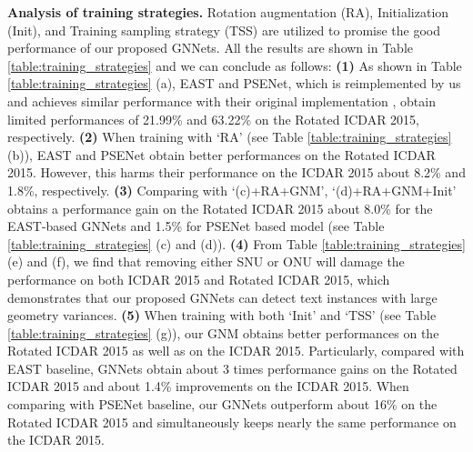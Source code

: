 \documentclass[10pt,twocolumn,letterpaper]{article}
\begin{document}
\textbf{Analysis of training strategies.} Rotation augmentation (RA), Initialization (Init), and Training sampling strategy (TSS) are utilized to promise the good performance of our proposed GNNets. All the results are shown in Table \ref{table:training_strategies} and we can conclude as follows:
\textbf{(1)} As shown in Table \ref{table:training_strategies} (a), EAST and PSENet, which is reimplemented by us and achieves similar performance with their original implementation \cite{Zhou2017, li2018shape}, obtain limited performances of 21.99\% and 63.22\% on the Rotated ICDAR 2015, respectively.
\textbf{(2)} When training with `RA' (see Table \ref{table:training_strategies} (b)), EAST and PSENet obtain better performances on the Rotated ICDAR 2015. However, this harms their performance on the ICDAR 2015 about 8.2\% and 1.8\%, respectively.
\textbf{(3)} Comparing with `(c)+RA+GNM', `(d)+RA+GNM+Init' obtains a performance gain on the Rotated ICDAR 2015 about 8.0\% for the EAST-based GNNets and 1.5\% for PSENet based model (see Table \ref{table:training_strategies} (c) and (d)).
\textbf{(4)} From Table \ref{table:training_strategies} (e) and (f), we find that removing either SNU or ONU will damage the performance on both ICDAR 2015 and Rotated ICDAR 2015, which demonstrates that our proposed GNNets can detect text instances with large geometry variances.
\textbf{(5)} When training with both `Init' and `TSS' (see Table \ref{table:training_strategies} (g)), our GNM obtains better performances on the Rotated ICDAR 2015 as well as on the ICDAR 2015. Particularly, compared with EAST baseline, GNNets obtain about 3 times performance gains on the Rotated ICDAR 2015 and about 1.4\% improvements on the ICDAR 2015. When comparing with PSENet baseline, our GNNets outperform about 16\% on the Rotated ICDAR 2015 and simultaneously keeps nearly the same performance on the ICDAR 2015.
\end{document}
